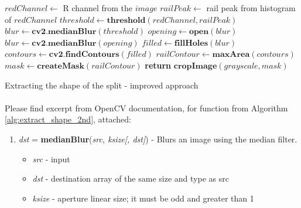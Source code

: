 \begin{algorithm}
	\begin{spacing}{1.5}
	\begin{algorithmic}[1]
			\State $redChannel \gets$ R channel from the $image$
			\State $railPeak \gets$ rail peak from histogram of $redChannel$
			\State $threshold \gets \textbf{threshold}(redChannel, railPeak)$
			\State $blur \gets \textbf{cv2.medianBlur}(threshold)$
				\State $opening \gets \textbf{open}(blur)$
				\State $blur \gets \textbf{cv2.medianBlur}(opening)$
			\EndFor
			\State $filled \gets \textbf{fillHoles}(blur)$
			\State $contours \gets \textbf{cv2.findContours}(filled)$
			\State $railContour \gets \textbf{maxArea}(contours)$
			\State $mask \gets \textbf{createMask}(railContour)$
			\State \textbf{return} $\textbf{cropImage}(grayscale, mask)$
		\EndFunction
	\end{algorithmic}
	\end{spacing}
	\caption{Extracting the shape of the split - improved approach}
	\label{alg:extract_shape_2nd}
\end{algorithm}

\paragraph{}
Please find excerpt from OpenCV documentation, for function from Algorithm \ref{alg:extract_shape_2nd}, attached: \cite{opencv-docs}

\begin{enumerate}
	\item \textit{dst} = \textbf{medianBlur}(\textit{src, ksize[, dst]}) - Blurs an image using the median filter. \small{\begin{itemize}
		\item \textit{src} - input
		\item \textit{dst} - destination array of the same size and type as src
		\item \textit{ksize} - aperture linear size; it must be odd and greater than 1
	\end{itemize}}
\end{enumerate}

